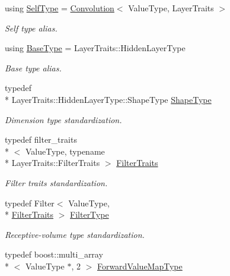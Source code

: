 \begin{DoxyCompactItemize}
\item 
using \hyperlink{classffnn_1_1layer_1_1_convolution_acbe0dcc4d5e3c8e65b4cd2677beca126}{Self\-Type} = \hyperlink{classffnn_1_1layer_1_1_convolution}{Convolution}$<$ Value\-Type, Layer\-Traits $>$
\begin{DoxyCompactList}\small\item\em Self type alias. \end{DoxyCompactList}\item 
using \hyperlink{classffnn_1_1layer_1_1_convolution_a473d9761dae92a5c7d3fa746647f2198}{Base\-Type} = Layer\-Traits\-::\-Hidden\-Layer\-Type
\begin{DoxyCompactList}\small\item\em Base type alias. \end{DoxyCompactList}\item 
typedef \\*
Layer\-Traits\-::\-Hidden\-Layer\-Type\-::\-Shape\-Type \hyperlink{classffnn_1_1layer_1_1_convolution_a70e1c8cd31ce4b5eef308c4b036d8393}{Shape\-Type}
\begin{DoxyCompactList}\small\item\em Dimension type standardization. \end{DoxyCompactList}\item 
typedef filter\-\_\-traits\\*
$<$ Value\-Type, typename \\*
Layer\-Traits\-::\-Filter\-Traits $>$ \hyperlink{classffnn_1_1layer_1_1_convolution_a747e95b6530d029de9ddcfd92cb0317a}{Filter\-Traits}
\begin{DoxyCompactList}\small\item\em Filter traits standardization. \end{DoxyCompactList}\item 
typedef Filter$<$ Value\-Type, \\*
\hyperlink{classffnn_1_1layer_1_1_convolution_a747e95b6530d029de9ddcfd92cb0317a}{Filter\-Traits} $>$ \hyperlink{classffnn_1_1layer_1_1_convolution_a992ae89b4a496563a3a7578d522a8f04}{Filter\-Type}
\begin{DoxyCompactList}\small\item\em Receptive-\/volume type standardization. \end{DoxyCompactList}\item 
typedef boost\-::multi\-\_\-array\\*
$<$ Value\-Type $\ast$, 2 $>$ \hyperlink{classffnn_1_1layer_1_1_convolution_a80b64b079d5e7d5a69779574989e8cce}{Forward\-Value\-Map\-Type}

\end{DoxyCompactItemize}
